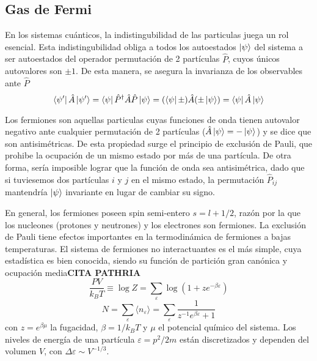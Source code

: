 \subsection{Gas de Fermi}{\label{sec:intro_fermi_gas}}

En los sistemas cuánticos, la indistingubilidad de las particulas juega un rol esencial.
Esta indistingubilidad obliga a todos los autoestados $\ket{\psi}$ del sistema a ser autoestados del operador permutación de 2 partículas $\hat{P}$, cuyos únicos autovalores son $\pm 1$.
De esta manera, se asegura la invarianza de los observables ante $\hat{P}$
\[\bra{\psi'}\hat{A}\ket{\psi'} = \bra{\psi}\hat{P}^\dagger\hat{A}\hat{P}\ket{\psi} = (\bra{\psi}\pm)\hat{A}(\pm\ket{\psi}) = \bra{\psi}\hat{A}\ket{\psi}\]

Los fermiones son aquellas particulas cuyas funciones de onda tienen autovalor negativo ante cualquier permutación de 2 partículas ($\hat{A}\ket{\psi} = -\ket{\psi}$) y se dice que son antisimétricas.
De esta propiedad surge el principio de exclusión de Pauli, que prohibe la ocupación de un mismo estado por más de una partícula.
De otra forma, sería imposible lograr que la función de onda sea antisimétrica, dado que si tuviesemos dos partículas $i$ y $j$ en el mismo estado, la permutación $\hat{P}_{ij}$ mantendría
$\ket{\psi}$ invariante en lugar de cambiar su signo.

En general, los fermiones poseen spin semi-entero $s=l+1/2$, razón por la que los nucleones (protones y neutrones) y los electrones son fermiones.
La exclusión de Pauli tiene efectos importantes en la termodinámica de fermiones a bajas temperaturas.
El sistema de fermiones no interactuantes es el más simple, cuya estadística es bien conocida, siendo su función de partición gran canónica y ocupación media\textbf{CITA PATHRIA}
\begin{equation}
 \frac{PV}{k_BT} \equiv \log Z = \sum_\varepsilon \log(1+ze^{-\beta\varepsilon})
\end{equation}
\begin{equation}
 N = \sum_\varepsilon \langle n_\varepsilon\rangle = \sum_\varepsilon \frac{1}{z^{-1}e^{\beta\varepsilon}+1}
\end{equation}
con $z=e^{\beta\mu}$ la fugacidad, $\beta=1/k_BT$ y $\mu$ el potencial químico del sistema.
Los niveles de energía de una partícula $\varepsilon=p^2/2m$ están discretizados y dependen del volumen $V$, con $\Delta\varepsilon\sim V^{-1/3}$.

